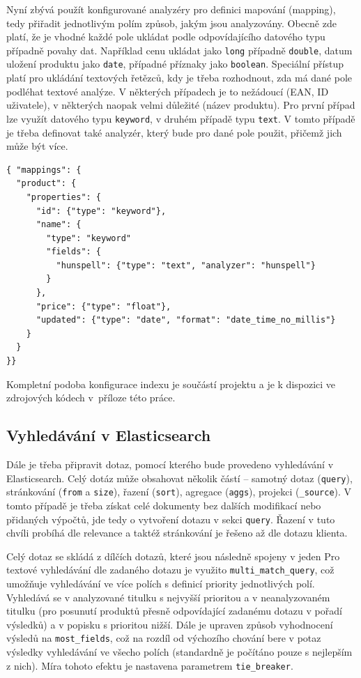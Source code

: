 \documentclass[FM,DP]{tulthesis}
\newenvironment{code}
    {\filbreak\captionsetup{type=listing}}{\filbreak}
\begin{document}
Nyní zbývá použít konfigurované analyzéry pro definici mapování (mapping), tedy přiřadit jednotlivým
polím způsob, jakým jsou analyzovány. Obecně zde platí, že je vhodné každé pole ukládat podle 
odpovídajícího datového typu případně povahy dat. Například cenu ukládat jako \verb|long| případně
\verb|double|, datum uložení produktu jako \verb|date|, případné příznaky jako \verb|boolean|.
Speciální přístup platí pro ukládání textových řetězců, kdy je třeba rozhodnout, zda má dané pole
podléhat textové analýze. V některých případech je to nežádoucí (EAN, ID uživatele), v některých
naopak velmi důležité (název produktu). Pro první případ lze využít datového typu \verb|keyword|, 
v druhém případě typu \verb|text|. V tomto případě je třeba definovat také analyzér, který bude pro 
dané pole použit, přičemž jich může být více.

\begin{code}
\captionsetup{singlelinecheck=false,justification=raggedright}
\label{code:es-mapping}
\begin{verbatim}
{ "mappings": {
  "product": {
    "properties": { 
      "id": {"type": "keyword"}, 
      "name": {
        "type": "keyword"
        "fields": {
          "hunspell": {"type": "text", "analyzer": "hunspell"}
        }
      },
      "price": {"type": "float"},
      "updated": {"type": "date", "format": "date_time_no_millis"}
    }
  }
}}
\end{verbatim}
\end{code}

Kompletní podoba konfigurace indexu je součástí projektu a je k dispozici ve zdrojových kódech 
v~příloze této práce.

\subsection{Vyhledávání v Elasticsearch}

Dále je třeba připravit dotaz, pomocí kterého bude provedeno vyhledávání v Elasticsearch.
Celý dotáz může obsahovat několik částí -- samotný dotaz (\verb|query|), stránkování 
(\verb|from| a \verb|size|), řazení (\verb|sort|), agregace (\verb|aggs|), projekci
(\verb|_source|). V tomto případě je třeba získat celé dokumenty bez dalších modifikací
nebo přidaných výpočtů, jde tedy o vytvoření dotazu v sekci \verb|query|. Řazení v tuto 
chvíli probíhá dle relevance a taktéž stránkování je řešeno až dle dotazu klienta.

Celý dotaz se skládá z dílčích dotazů, které jsou následně spojeny v jeden
Pro textové vyhledávání dle zadaného dotazu je využito \verb|multi_match_query|, 
což umožňuje vyhledávání ve více polích s definicí priority jednotlivých polí.
Vyhledává se v analyzované titulku s nejvyšší prioritou a v neanalyzovaném titulku (pro posunutí
produktů přesně odpovídající zadanému dotazu v pořadí výsledků) a v popisku s prioritou nižší.
Dále je upraven způsob vyhodnocení výsledů na \verb|most_fields|, což na rozdíl
od výchozího chování bere v potaz výsledky vyhledávání ve všecho polích (standardně je počítáno
pouze s nejlepším z nich). Míra tohoto efektu je nastavena parametrem \verb|tie_breaker|.
\end{document}

